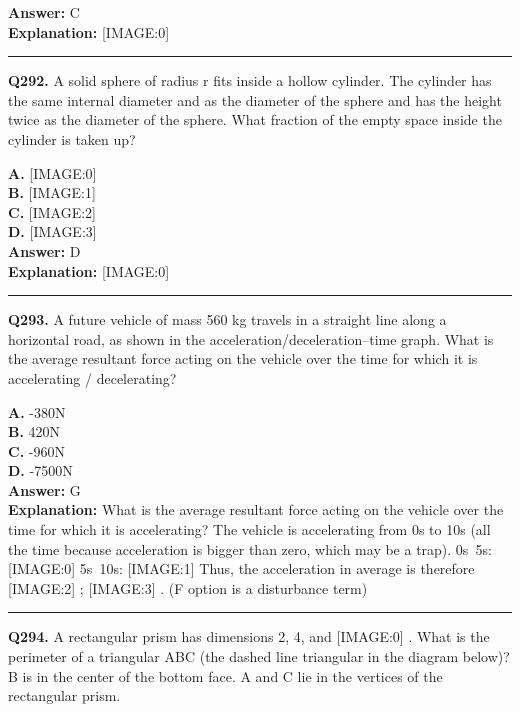 \documentclass[12pt]{article}
\begin{document}
\textbf{Answer:} C \\
\textbf{Explanation:} [IMAGE:0]

\hrule
\vspace{1em}


\noindent
\textbf{Q292.} A solid sphere of radius r fits inside a hollow cylinder. The cylinder has the same internal diameter and as the diameter of the sphere and has the height twice as the diameter of the sphere. What fraction of the empty space inside the cylinder is taken up?



\textbf{A.} [IMAGE:0] \\
\textbf{B.} [IMAGE:1] \\
\textbf{C.} [IMAGE:2] \\
\textbf{D.} [IMAGE:3] \\

\textbf{Answer:} D \\
\textbf{Explanation:} [IMAGE:0]

\hrule
\vspace{1em}


\noindent
\textbf{Q293.} A future vehicle of mass 560 kg travels in a straight line along a horizontal road, as shown in the acceleration/deceleration–time graph.
What is the average resultant force acting on the vehicle over the time for which it is accelerating / decelerating?



\textbf{A.} -380N \\
\textbf{B.} 420N \\
\textbf{C.} -960N \\
\textbf{D.} -7500N \\

\textbf{Answer:} G \\
\textbf{Explanation:} What is the average resultant force acting on the vehicle over the time for which it is accelerating?
The vehicle is accelerating from 0s to 10s (all the time because acceleration is bigger than zero, which may be a trap).
0s~5s:
[IMAGE:0]
5s~10s:
[IMAGE:1]
Thus, the acceleration in average is therefore
[IMAGE:2]
;
[IMAGE:3]
. (F option is a disturbance term)

\hrule
\vspace{1em}


\noindent
\textbf{Q294.} A rectangular prism has dimensions 2, 4, and
[IMAGE:0]
. What is the perimeter of a triangular ABC (the dashed line triangular in the diagram below)? B is in the center of the bottom face. A and C lie in the vertices of the rectangular prism.
\end{document}

